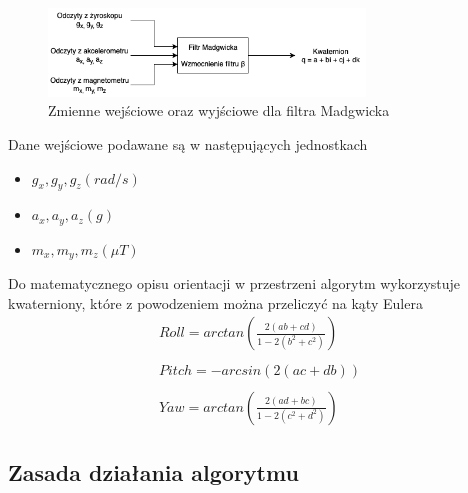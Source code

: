 \begin{figure}[h!]
    \centering
    \includegraphics[width=0.75\textwidth]{Rysunki/Rozdzial04/Madgwick_idea.png}
    \caption{Zmienne wejściowe oraz wyjściowe dla filtra Madgwicka}
    \label{Madgwick idea}
\end{figure}

Dane wejściowe podawane są w następujących jednostkach
\begin{itemize}
    \item $g_x, g_y, g_z (rad/s)$
    \item $a_x, a_y, a_z (g)$
    \item $m_x, m_y, m_z (\mu T)$
\end{itemize}

Do matematycznego opisu orientacji w przestrzeni algorytm wykorzystuje kwaterniony, które z powodzeniem można przeliczyć na kąty Eulera
$$
    \begin{array}{l}
        Roll = arctan\left(\frac{2(ab + cd)}{1 - 2(b^2 + c^2)}\right) \\ \\
        Pitch = -arcsin(2(ac + db)) \\ \\
        Yaw = arctan\left(\frac{2(ad + bc)}{1 - 2(c^2 + d^2)}\right) 
    \end{array}
$$

\subsection{Zasada działania algorytmu}

